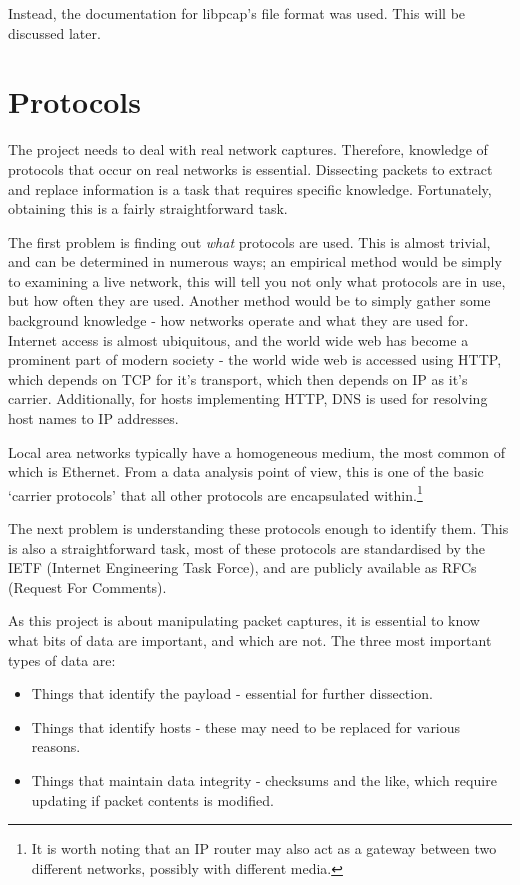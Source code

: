 \documentclass[10pt,a4paper,notitlepage,twoside]{report}
\begin{document}
Instead, the documentation for libpcap's file format was used. This will be discussed later.

\section{Protocols}
The project needs to deal with real network captures. Therefore, knowledge of protocols that occur on real networks is essential. Dissecting packets to extract and replace information is a task that requires specific knowledge. Fortunately, obtaining this is a fairly straightforward task.

The first problem is finding out \emph{what} protocols are used. This is almost trivial, and can be determined in numerous ways; an empirical method would be simply to examining a live network, this will tell you not only what protocols are in use, but how often they are used.
Another method would be to simply gather some background knowledge - how networks operate and what they are used for. Internet access is almost ubiquitous, and the world wide web has become a prominent part of modern society - the world wide web is accessed using HTTP, which depends on TCP for it's transport, which then depends on IP as it's carrier. Additionally, for hosts implementing HTTP, DNS is used for resolving host names to IP addresses.

Local area networks typically have a homogeneous medium, the most common of which is Ethernet. From a data analysis point of view, this is one of the basic `carrier protocols' that all other protocols are encapsulated within.\footnote{It is worth noting that an IP router may also act as a gateway between two different networks, possibly with different media.}

The next problem is understanding these protocols enough to identify them. This is also a straightforward task, most of these protocols are standardised by the IETF (Internet Engineering Task Force), and are publicly available as RFCs (Request For Comments).

As this project is about manipulating packet captures, it is essential to know what bits of data are important, and which are not. The three most important types of data are:
\begin{itemize}
\item Things that identify the payload - essential for further dissection.
\item Things that identify hosts - these may need to be replaced for various reasons.
\item Things that maintain data integrity - checksums and the like, which require updating if packet contents is modified.
\end{itemize}
\end{document}
